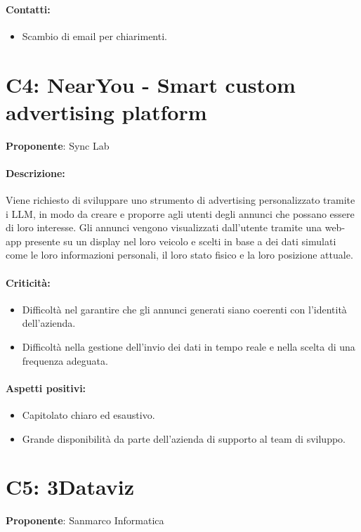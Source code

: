 \documentclass{TWDocumentFull}
\begin{document}
    \paragraph{Contatti:}
    \begin{itemize}
        \item Scambio di email per chiarimenti.
    \end{itemize}

    \section*{C4: NearYou - Smart custom advertising platform}
    {\textbf{Proponente}: Sync Lab}
    \paragraph{Descrizione:\\}
    {Viene richiesto di sviluppare uno strumento di advertising personalizzato tramite i LLM, in modo da creare e proporre agli utenti degli annunci che possano essere di loro interesse. Gli annunci vengono visualizzati dall'utente tramite una web-app presente su un display nel loro veicolo e scelti in base a dei dati simulati come le loro informazioni personali, il loro stato fisico e la loro posizione attuale. }
    \paragraph{Criticità:}
    \begin{itemize}
        \item Difficoltà nel garantire che gli annunci generati siano coerenti con l'identità dell'azienda.
        \item Difficoltà nella gestione dell'invio dei dati in tempo reale e nella scelta di una frequenza adeguata.
    \end{itemize}
    \paragraph{Aspetti positivi:}
    \begin{itemize}
        \item Capitolato chiaro ed esaustivo.
        \item Grande disponibilità da parte dell'azienda di supporto al team di sviluppo.
    \end{itemize}

    \section*{C5: 3Dataviz}
    {\textbf{Proponente}: Sanmarco Informatica}
\end{document}
